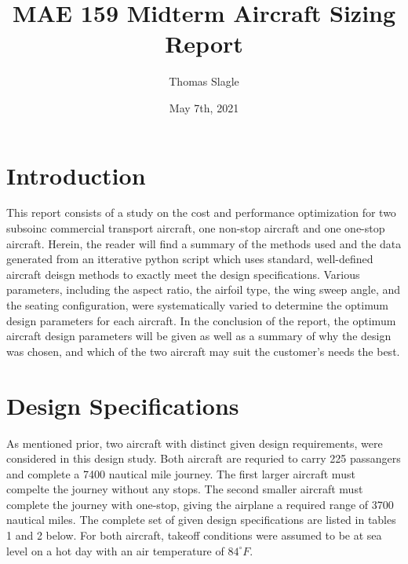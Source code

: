 \documentclass{article}
\title{MAE 159 Midterm Aircraft Sizing Report}
\author{Thomas Slagle}
\date{May 7th, 2021}
\begin{document}
    \maketitle

    \section{Introduction}
    \label{sec:intro}
    \begin{flushleft}
        This report consists of a study on the cost and performance optimization
        for two subsoinc commercial transport aircraft, one non-stop aircraft
        and one one-stop aircraft. Herein, the reader will find a summary of the
        methods used and the data generated from an itterative python script
        which uses standard, well-defined aircraft deisgn methods to exactly
        meet the design specifications. Various parameters, including the aspect
        ratio, the airfoil type, the wing sweep angle, and the seating
        configuration, were systematically varied to determine the optimum
        design parameters for each aircraft. In the conclusion of the report,
        the optimum aircraft design parameters will be given as well as a
        summary of why the design was chosen, and which of the two
        aircraft may suit the customer's needs the best.
    \end{flushleft}

    \section{Design Specifications}
    \label{sec:specs}
    \begin{flushleft}
        As mentioned prior, two aircraft with distinct given design
        requirements, were considered in this design study. Both aircraft are
        requried to carry 225 passangers and complete a 7400 nautical mile
        journey. The first larger aircraft must compelte the journey without any
        stops. The second smaller aircraft must complete the journey with
        one-stop, giving the airplane a required range of 3700 nautical miles.
        The complete set of given design specifications are listed in tables 1
        and 2 below. For both aircraft, takeoff conditions were assumed to be at
        sea level on a hot day with an air temperature of $84^{\circ}F$.
    \end{flushleft}
\end{document}
